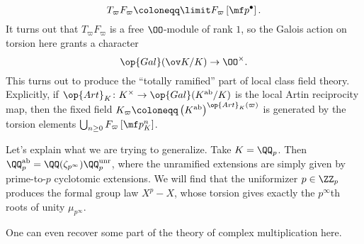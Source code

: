 \documentclass[../notes.tex]{subfiles}
\begin{document}
\[T_\varpi F_\varpi\coloneqq\limit F_\varpi\left[\mf p^\bullet\right].\]
It turns out that $T_\varpi F_\varpi$ is a free $\OO$-module of rank $1$, so the Galois action on torsion here grants a character
\[\op{Gal}(\ov K/K)\to\OO^\times.\]
This turns out to produce the ``totally ramified'' part of local class field theory. Explicitly, if $\op{Art}_K\colon K^\times\to\op{Gal}(K^{\mathrm{ab}}/K)$ is the local Artin reciprocity map, then the fixed field $K_\varpi\coloneqq\left(K^{\mathrm{ab}}\right)^{\op{Art}_K(\varpi)}$ is generated by the torsion elements $\bigcup_{n\ge0}F_\varpi\left[\mf p_K^n\right]$.
\begin{example}
	Let's explain what we are trying to generalize. Take $K=\QQ_p$. Then $\QQ_p^{\mathrm{ab}}=\QQ(\zeta_{p^\infty})\QQ_p^{\mathrm{unr}}$, where the unramified extensions are simply given by prime-to-$p$ cyclotomic extensions. We will find that the uniformizer $p\in\ZZ_p$ produces the formal group law $X^p-X$, whose torsion gives exactly the $p^\infty$th roots of unity $\mu_{p^\infty}$.
\end{example}
One can even recover some part of the theory of complex multiplication here.
\end{document}
